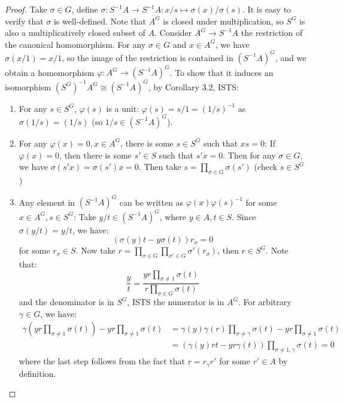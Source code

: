 \documentclass{solution}
\begin{document}
\begin{proof}
    Take $\sigma \in G$, define $\sigma: S ^{-1} A \rightarrow S ^{-1} A: x / s \mapsto \sigma(x) / \sigma(s)$. It is easy to verify that $\sigma$ is well-defined. Note that $A^G$ is closed under multiplication, so $S^G$ is also a multiplicatively closed subset of $A$. Consider $A^G \rightarrow S ^{-1} A$ the restriction of the canonical homomorphism. For any $\sigma \in G$ and $x \in A^G$, we have $\sigma(x / 1) = x / 1$, so the image of the restriction is contained in $(S ^{-1} A)^G$, and we obtain a homomorphism $\varphi: A^G \rightarrow (S ^{-1} A)^G$. To show that it induces an isomorphism $(S^G)^{-1} A^G \cong (S ^{-1} A)^G$, by Corollary 3.2, ISTS:
    \begin{enumerate}
        \item For any $s \in S^G$, $\varphi(s)$ is a unit: $\varphi(s) = s / 1 = (1 / s) ^{-1}$ as $\sigma(1 / s) = (1 / s)$ (so $1 / s \in (S ^{-1} A)^G$). 
        \item For any $\varphi(x) = 0, x \in A^G$, there is some $s \in S^G$ such that $xs = 0$: If $\varphi(x) = 0$, then there is some $s' \in S$ such that $s'x = 0$. Then for any $\sigma \in G$, we have $\sigma(s'x) = \sigma(s')x = 0$. Then take $s = \prod\limits_{\sigma \in G} \sigma(s')$ (check $s \in S^G$)
        \item Any element in $(S ^{-1}A)^G$ can be written as $\varphi(x) \varphi(s)^{-1}$ for some $x \in A^G, s \in S^G$: Take $y / t \in (S ^{-1} A)^G$, where $y \in A, t \in S$. Since $\sigma(y / t) = y / t$, we have:
        $$(\sigma(y) t - y \sigma(t))r_{\sigma} = 0$$
        for some $r_{\sigma} \in S$. Now take $r = \prod\limits_{\sigma \in G} \prod\limits_{\sigma' \in G} \sigma'(r_{\sigma})$, then $r \in S^G$. Note that:
        $$\frac{y}{t} = \frac{y r\prod\limits_{\sigma \ne 1} \sigma(t)}{r\prod\limits_{\sigma \in G} \sigma(t)}$$
        and the denominator is in $S^G$, ISTS the numerator is in $A^G$. For arbitrary $\gamma \in G$, we have:
        $$
            \begin{aligned}
            \gamma\left(yr \prod\limits_{\sigma \ne 1} \sigma(t)\right) - yr \prod\limits_{\sigma \ne 1} \sigma(t) &= \gamma(y) \gamma(r) \prod\limits_{\sigma \ne \gamma} \sigma(t) - yr \prod\limits_{\sigma \ne 1} \sigma(t) \\
            &= (\gamma(y) r t - yr \gamma(t)) \prod\limits_{\sigma \ne 1, \gamma} \sigma(t) = 0
            \end{aligned}
        $$
        where the last step follows from the fact that $r = r_{\gamma} r'$ for some $r' \in A$ by definition.
    \end{enumerate}
\end{proof}
\end{document}
